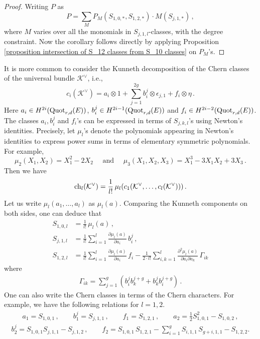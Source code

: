 \documentclass[11pt]{amsart}
\theoremstyle{remark}
\newcommand{\e}{\epsilon}
\newcommand{\ch}{{\rm ch}}
\newcommand{\p}{\partial}
\newcommand{\K}{\mathcal{K}}
\newcommand{\quot}[0]{\textnormal{Quot}}
\numberwithin{theorem}{section}
\begin{document}
\begin{proof}
    Writing $P$ as
    $$P = \sum_{M} P_{M}(S_{1,0,*},S_{1,2,*}) \cdot M(S_{j,1,*})\,,$$
    where $M$ varies over all the monomials in $S_{j,1,l}$-classes,
    with the degree constraint.
    Now the corollary follows directly by applying Proposition \ref{proposition intersection of S_12 classes from S_10 classes}
    on $P_M$'s.
\end{proof}
It is more common to consider the Kunneth decomposition of the Chern classes of the universal bundle $\K^\vee$, i.e.,
$$ c_i(\K^\vee) = a_i \otimes 1 + \sum_{j=1}^{2g} b_i^j \otimes \e_{j,1} + f_i \otimes \eta \,.
$$
Here $a_i \in H^{2i}(\quot_{r,d}(E))$, $b_i^j \in H^{2i-1}(\quot_{r,d}(E))$ and 
$f_i \in H^{2i-2}(\quot_{r,d}(E))$.
The classes $a_i,b_i^j$ and $f_i$'s can be expressed in terms of $S_{j,k,l}$'s using Newton's identities.
Precisely, let $\mu_l$'s denote the polynomials appearing in Newton's identities to express power sums in terms of elementary symmetric polynomials.
For example, 
$$\mu_2(X_1,X_2)=X_1^2 - 2X_2 \quad \text{ and }
\quad \mu_3(X_1,X_2,X_3)= X_1^3 - 3X_1X_2 + 3X_3\,.$$
Then we have 
$$ \ch_l(\K^\vee) = \frac{1}{l!} \, \mu_l(c_1(\K^\vee, \dots, c_l(\K^\vee)))\,. $$
Let us write $\mu_l(a_1,\dots,a_l)$ as $\mu_l(a)$.
Comparing the Kunneth components on both sides, one can deduce that
\begin{align}\label{equation Sjkl to abf}
\nonumber
S_{1,0,l} &= \frac{1}{l!} \, \mu_l(a) \,,\\
S_{j,1,l} &= \frac{1}{l!} \sum_{i=1}^l \frac{\p \mu_l(a)}{\p a_i} \, b_i^j \,, \\
\nonumber
S_{1,2,l} &= \frac{1}{l!} \sum_{i=1}^l \frac{\p \mu_l(a)}{\p a_i} \, f_i 
- \frac{1}{2 \cdot l!} \sum_{i,k=1}^l \frac{\p^2 \mu_l(a)}{\p a_i \p a_k} \, \Gamma_{ik}
\end{align}
where
\begin{align}\label{equation Gamma_ik}
 \Gamma_{ik} = \sum_{j=1}^g (b_i^j b_k^{j+g} + b_k^j b_i^{j+g})\,.
 \end{align}
One can also write the Chern classes in terms of the Chern characters. For example, we have the following relations for $l=1,2$.
\begin{align*}
a_1=S_{1,0,1}\,, \qquad  b_1^j=S_{j,1,1} \,, 
\qquad
f_1 = S_{1,2,1}\,, \qquad a_2= \frac{1}{2}S_{1,0,1}^2 - S_{1,0,2} \,,
\end{align*}
\begin{align*}
b_2^j = S_{1,0,1}S_{j,1,1}- S_{j,1,2}\,,  \qquad 
f_2=S_{1,0,1}\, S_{1,2,1}-\sum_{i=1}^g S_{i,1,1}\, S_{g+i,1,1}-S_{1,2,2}.
\end{align*}
\end{document}

